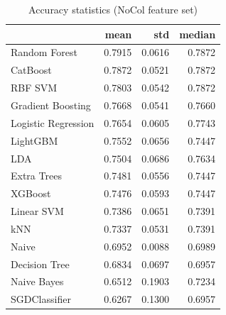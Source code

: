 \begin{table}
\caption{Accuracy statistics (NoCol feature set)}
\label{tab:accuracy_NoCol_stats}
\begin{tabular}{lrrr}
\toprule
 & mean & std & median \\
\midrule
Random Forest & 0.7915 & 0.0616 & 0.7872 \\
CatBoost & 0.7872 & 0.0521 & 0.7872 \\
RBF SVM & 0.7803 & 0.0542 & 0.7872 \\
Gradient Boosting & 0.7668 & 0.0541 & 0.7660 \\
Logistic Regression & 0.7654 & 0.0605 & 0.7743 \\
LightGBM & 0.7552 & 0.0656 & 0.7447 \\
LDA & 0.7504 & 0.0686 & 0.7634 \\
Extra Trees & 0.7481 & 0.0556 & 0.7447 \\
XGBoost & 0.7476 & 0.0593 & 0.7447 \\
Linear SVM & 0.7386 & 0.0651 & 0.7391 \\
kNN & 0.7337 & 0.0531 & 0.7391 \\
Naive & 0.6952 & 0.0088 & 0.6989 \\
Decision Tree & 0.6834 & 0.0697 & 0.6957 \\
Naive Bayes & 0.6512 & 0.1903 & 0.7234 \\
SGDClassifier & 0.6267 & 0.1300 & 0.6957 \\
\bottomrule
\end{tabular}
\end{table}
